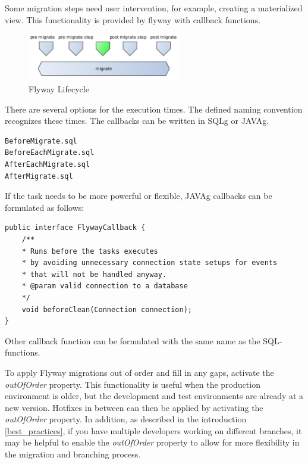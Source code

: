 %
Some migration steps need user intervention, for example, creating a materialized view. This functionality is provided by flyway with callback functions. 

\begin{figure}[H]
	\centering
	\includegraphics[width=0.6\textwidth]{./chapters/intro_flyway/images/advanced_migrations}
	\caption[Flyway Lifecycle - Source: \cite{Parsick2018}]{Flyway Lifecycle}
	\label{fig:advanced_migrations}
\end{figure}

There are several options for the execution times. The defined naming convention recognizes these times. The callbacks can be written in \gls{SQLg} or \gls{JAVAg}. 

\begin{lstlisting}[caption=SQL Callback Functions for Flyway - Source: \cite{FlywayCallbacks}]
BeforeMigrate.sql
BeforeEachMigrate.sql
AfterEachMigrate.sql
AfterMigrate.sql
\end{lstlisting}

If the task needs to be more powerful or flexible, \gls{JAVAg} callbacks can be formulated as follows:
\begin{lstlisting}[caption=Java Callback Functions before clean - Source: \cite{FlywayCallbacks}]
public interface FlywayCallback {
	/**
	* Runs before the tasks executes
	* by avoiding unnecessary connection state setups for events 
	* that will not be handled anyway.
	* @param valid connection to a database
	*/
	void beforeClean(Connection connection);
}
\end{lstlisting}
Other callback function can be formulated with the same name as the SQL-functions.

%
To apply Flyway migrations out of order and fill in any gaps, activate the \textit{outOfOrder} property. This functionality is useful when the production environment is older, but the development and test environments are already at a new version. Hotfixes in between can then be applied by activating the \textit{outOfOrder} property. In addition, as described in the introduction \autoref{best_practices}, if you have multiple developers working on different branches, it may be helpful to enable the \textit{outOfOrder} property to allow for more flexibility in the migration and branching process.


